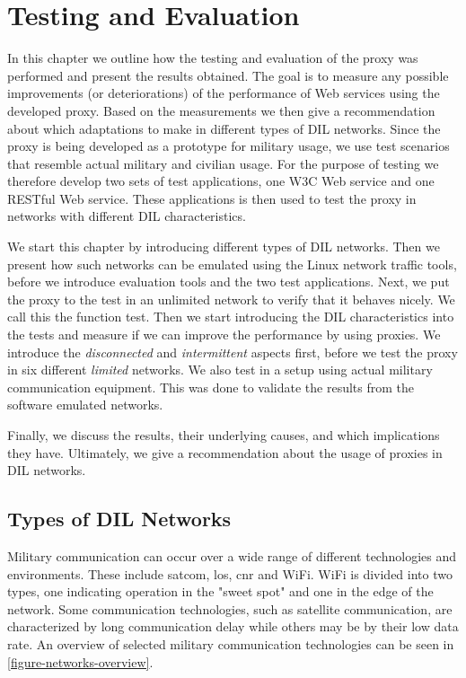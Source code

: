 \chapter{Testing and Evaluation}

\label{chapter:evaluation}

In this chapter we outline how the testing and evaluation of the proxy was
performed and present the results obtained. The goal is to measure any possible
improvements (or deteriorations) of the performance of Web services using the
developed proxy. Based on the measurements we then give a recommendation about
which adaptations to make in different types of DIL networks. Since the proxy is
being developed as a prototype for military usage, we use test scenarios that
resemble actual military and civilian usage. For the purpose of testing we
therefore develop two sets of test applications, one W3C Web service and one
RESTful Web service. These applications is then used to test the proxy in
networks with different DIL characteristics.

We start this chapter by introducing different types of DIL networks. Then we
present how such networks can be emulated using the Linux network traffic tools,
before we introduce evaluation tools and the two test applications. Next, we put
the proxy to the test in an unlimited network to verify that it behaves nicely.
We call this the function test. Then we start introducing the DIL
characteristics into the tests and measure if we can improve the performance by
using proxies. We introduce the \textit{disconnected} and \textit{intermittent}
aspects first, before we test the proxy in six different \textit{limited}
networks. We also test in a setup using actual military communication equipment.
This was done to validate the results from the software emulated networks.

Finally, we discuss the results, their underlying causes, and which implications
they have. Ultimately, we give a recommendation about the usage of proxies in
DIL networks.

\section{Types of DIL Networks}

Military communication can occur over a wide range of different technologies and
environments. These include \gls{satcom}, \gls{los}, \gls{cnr} and WiFi. WiFi is
divided into two types, one indicating operation in the "sweet spot" and one in
the edge of the network. Some communication technologies, such as satellite
communication, are characterized by long communication delay while others may be
by their low data rate. An overview of selected military communication
technologies can be seen in \cref{figure-networks-overview}.

